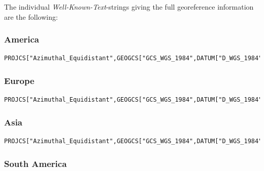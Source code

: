 \documentclass[10pt,a4paper]{article}
\begin{document}
The individual \textit{Well-Known-Text}-strings giving the full georeference information are the following:

\subsubsection*{America}

\begin{lstlisting}
PROJCS["Azimuthal_Equidistant",GEOGCS["GCS_WGS_1984",DATUM["D_WGS_1984",SPHEROID["WGS_1984",6378137.0,298.257223563]],PRIMEM["Greenwich",0.0],UNIT["Degree",0.0174532925199433]],PROJECTION["Azimuthal_Equidistant"],PARAMETER["false_easting",8264722.17686],PARAMETER["false_northing",4867518.35323],PARAMETER["central_meridian",-97.5],PARAMETER["latitude_of_origin",52.0],UNIT["Meter",1.0]]
\end{lstlisting}

\subsubsection*{Europe}

\begin{lstlisting}
PROJCS["Azimuthal_Equidistant",GEOGCS["GCS_WGS_1984",DATUM["D_WGS_1984",SPHEROID["WGS_1984",6378137.0,298.257223563]],PRIMEM["Greenwich",0.0],UNIT["Degree",0.0174532925199433]],PROJECTION["Azimuthal_Equidistant"],PARAMETER["false_easting",5837287.81977],PARAMETER["false_northing",2121415.69617],PARAMETER["central_meridian",24.0],PARAMETER["latitude_of_origin",53.0],UNIT["Meter",1.0]]
\end{lstlisting}

\subsubsection*{Asia}

\begin{lstlisting}
PROJCS["Azimuthal_Equidistant",GEOGCS["GCS_WGS_1984",DATUM["D_WGS_1984",SPHEROID["WGS_1984",6378137.0,298.257223563]],PRIMEM["Greenwich",0.0],UNIT["Degree",0.0174532925199433]],PROJECTION["Azimuthal_Equidistant"],PARAMETER["false_easting",4340913.84808],PARAMETER["false_northing",4812712.92347],PARAMETER["central_meridian",94.0],PARAMETER["latitude_of_origin",47.0],UNIT["Meter",1.0]]
\end{lstlisting}

\subsubsection*{South America}
\end{document}
